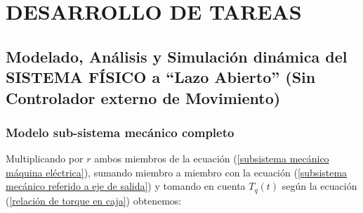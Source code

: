 \documentclass[a4paper, 10pt, onecolumn,journal]{ieeeconf}
\begin{document}
\section{DESARROLLO DE TAREAS}


\subsection{\textbf{Modelado, Análisis y Simulación dinámica del SISTEMA FÍSICO a “Lazo
Abierto” (Sin Controlador externo de Movimiento)}}



\subsubsection{\textbf{Modelo sub-sistema mecánico completo}}
Multiplicando por $r$ ambos miembros de la ecuación (\ref{subsistema mecánico máquina eléctrica}), sumando miembro a miembro con la ecuación (\ref{subsistema mecánico referido a eje de salida}) y tomando en cuenta $T_q(t)$ según la ecuación (\ref{relación de torque en caja}) obtenemos:
\end{document}
